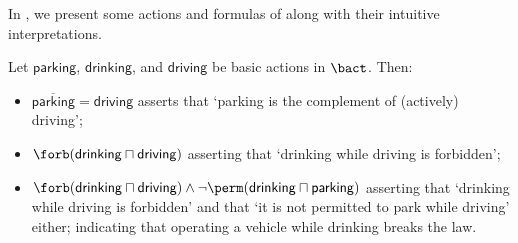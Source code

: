 \medskip 

In , we present some actions and formulas of \DAL along with their intuitive interpretations.

\medskip

\begin{example}\label{ex:syntax}
Let $\mathsf{parking}$, $\mathsf{drinking}$, and $\mathsf{driving}$ be basic actions in $\bact$. Then:

\medskip
\begin{itemize}
	\item $\overline{\mathsf{parking}} = \mathsf{driving}$ asserts that `parking is the complement of (actively) driving';
	\item $\forb(\mathsf{drinking} \sqcap \mathsf{driving})$ asserting that `drinking while driving is forbidden';
	\item $\forb(\mathsf{drinking} \sqcap \mathsf{driving}) \land \lnot\perm(\mathsf{drinking} \sqcap \mathsf{parking})$ asserting that `drinking while driving is forbidden' and that `it is not permitted to park while driving' either; indicating that operating a vehicle while drinking breaks the law.
\end{itemize}
\end{example}


